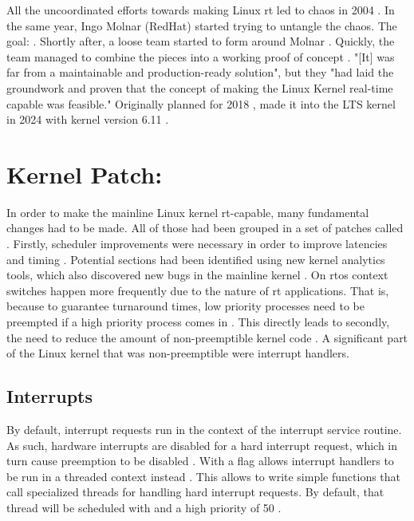 \documentclass[10pt,twocolumn,a4paper]{article}
\begin{document}
\noindent All the uncoordinated efforts towards making Linux \acrshort{rt} led to chaos in 2004 \cite{jason_perlow_trenches_2021}.
In the same year, Ingo Molnar (RedHat) started trying to untangle the chaos.
The goal: .
Shortly after, a loose team started to form around Molnar \cite{jason_perlow_trenches_2021}.
Quickly, the team managed to combine the pieces into a working proof of concept \cite{jason_perlow_trenches_2021}.
"[It] was far from a maintainable and production-ready solution", but they "had laid the groundwork and proven that the concept of making the Linux Kernel real-time capable was feasible."\cite{jason_perlow_trenches_2021}
Originally planned for 2018 \cite{lf:history},  made it into the LTS kernel in 2024 with kernel version 6.11 \cite{lf:versions}.

\section{Kernel Patch: }
In order to make the mainline Linux kernel \acrshort{rt}-capable, many fundamental changes had to be made.
All of those had been grouped in a set of patches called .
Firstly, scheduler improvements were necessary in order to improve latencies and timing \cite{mckenney_realtime_2005}.
Potential sections had been identified using new kernel analytics tools, which also discovered new bugs in the mainline kernel \cite{reghenzani_realtime_2019}.
On \acrshort{rtos} context switches happen more frequently due to the nature of \acrshort{rt} applications.
That is, because to guarantee turnaround times, low priority processes need to be preempted if a high priority process comes in \cite{buttazzo_hard_1997}.
This directly leads to secondly, the need to reduce the amount of non-preemptible kernel code \cite{reghenzani_realtime_2019}.
A significant part of the Linux kernel that was non-preemptible were interrupt handlers.

\subsection{Interrupts}
By default, interrupt requests run in the context of the interrupt service routine.
As such, hardware interrupts are disabled for a hard interrupt request, which in turn cause preemption to be disabled \cite{lf:irq}.
With  a flag allows interrupt handlers to be run in a threaded context instead \cite{reghenzani_realtime_2019, lf:irq}.
This allows to write simple functions that call specialized threads for handling hard interrupt requests\cite{reghenzani_realtime_2019}.
By default, that thread will be scheduled with  and a high priority of 50 \cite{lf:irq}.
\end{document}
